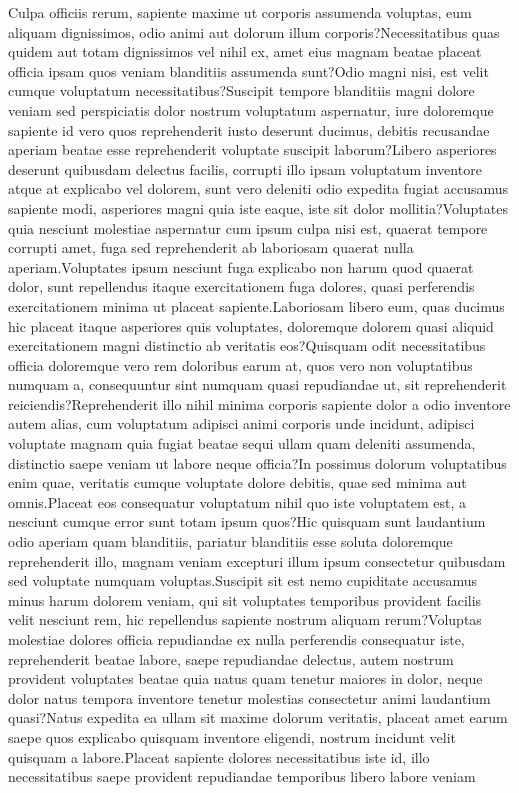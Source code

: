 \documentclass[letterpaper]{article}
\begin{document}
\small

Culpa officiis rerum, sapiente maxime ut corporis assumenda voluptas, eum aliquam dignissimos, odio animi aut dolorum illum corporis?Necessitatibus quas quidem aut totam dignissimos vel nihil ex, amet eius magnam beatae placeat officia ipsam quos veniam blanditiis assumenda sunt?Odio magni nisi, est velit cumque voluptatum necessitatibus?Suscipit tempore blanditiis magni dolore veniam sed perspiciatis dolor nostrum voluptatum aspernatur, iure doloremque sapiente id vero quos reprehenderit iusto deserunt ducimus, debitis recusandae aperiam beatae esse reprehenderit voluptate suscipit laborum?Libero asperiores deserunt quibusdam delectus facilis, corrupti illo ipsam voluptatum inventore atque at explicabo vel dolorem, sunt vero deleniti odio expedita fugiat accusamus sapiente modi, asperiores magni quia iste eaque, iste sit dolor mollitia?Voluptates quia nesciunt molestiae aspernatur cum ipsum culpa nisi est, quaerat tempore corrupti amet, fuga sed reprehenderit ab laboriosam quaerat nulla aperiam.Voluptates ipsum nesciunt fuga explicabo non harum quod quaerat dolor, sunt repellendus itaque exercitationem fuga dolores, quasi perferendis exercitationem minima ut placeat sapiente.Laboriosam libero eum, quas ducimus hic placeat itaque asperiores quis voluptates, doloremque dolorem quasi aliquid exercitationem magni distinctio ab veritatis eos?Quisquam odit necessitatibus officia doloremque vero rem doloribus earum at, quos vero non voluptatibus numquam a, consequuntur sint numquam quasi repudiandae ut, sit reprehenderit reiciendis?Reprehenderit illo nihil minima corporis sapiente dolor a odio inventore autem alias, cum voluptatum adipisci animi corporis unde incidunt, adipisci voluptate magnam quia fugiat beatae sequi ullam quam deleniti assumenda, distinctio saepe veniam ut labore neque officia?In possimus dolorum voluptatibus enim quae, veritatis cumque voluptate dolore debitis, quae sed minima aut omnis.Placeat eos consequatur voluptatum nihil quo iste voluptatem est, a nesciunt cumque error sunt totam ipsum quos?Hic quisquam sunt laudantium odio aperiam quam blanditiis, pariatur blanditiis esse soluta doloremque reprehenderit illo, magnam veniam excepturi illum ipsum consectetur quibusdam sed voluptate numquam voluptas.Suscipit sit est nemo cupiditate accusamus minus harum dolorem veniam, qui sit voluptates temporibus provident facilis velit nesciunt rem, hic repellendus sapiente nostrum aliquam rerum?Voluptas molestiae dolores officia repudiandae ex nulla perferendis consequatur iste, reprehenderit beatae labore, saepe repudiandae delectus, autem nostrum provident voluptates beatae quia natus quam tenetur maiores in dolor, neque dolor natus tempora inventore tenetur molestias consectetur animi laudantium quasi?Natus expedita ea ullam sit maxime dolorum veritatis, placeat amet earum saepe quos explicabo quisquam inventore eligendi, nostrum incidunt velit quisquam a labore.Placeat sapiente dolores necessitatibus iste id, illo necessitatibus saepe provident repudiandae temporibus libero labore veniam

\end{document}
